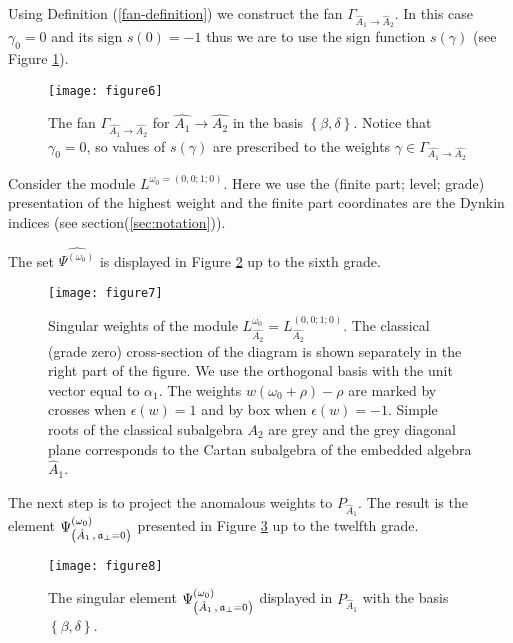 Using Definition (\ref{fan-definition})  we construct the fan $\Gamma_{\hat A_1\to\hat A_2}$.
In this case $\gamma_0 =0$ and its sign $s\left( 0 \right)=-1$ thus we are to use the
sign function $s(\gamma)$ (see Figure \ref{fig:AffineA2A1Fan}).


\begin{figure}[h!bt]
  \centering
  \texttt{[image: figure6]}

  \caption{The fan $\Gamma_{\hat{A_1}\rightarrow \hat{A_2}}$ for $\hat{A_1}\rightarrow \hat{A_2}$
  in the basis $\left\{\beta,\delta \right\}$. Notice that $\gamma_0 =0$, so values of $s(\gamma)$
  are prescribed to the weights $\gamma\in \Gamma_{\hat{A_1}\rightarrow \hat{A_2}}$}
  \label{fig:AffineA2A1Fan}
\end{figure}

Consider the module $L^{\omega_0=(0,0;1;0)}$. Here we use the (finite part; level; grade)
presentation of the highest weight and the finite part
coordinates are the Dynkin indices (see section(\ref{sec:notation})).

The set $\widehat{\Psi^{(\omega_0)}}$  is displayed in Figure
\ref{fig:affine_A2_anom_point} up to the sixth grade.

\begin{figure}[h!tb]
  \hspace*{-1.5cm}
  \texttt{[image: figure7]}
  \caption{Singular weights of the module $L_{\hat{A_2}}^{\omega_0}=L^{(0,0;1;0)}_{\hat{A_2}}$.
   The classical (grade zero) cross-section of the diagram is shown separately
   in the right part of the figure.
  We use the orthogonal basis with the unit vector equal to $\alpha_1$.
  The weights $w (\omega_0+\rho)-\rho$ are marked by crosses when $\epsilon(w)=1$ and
by box when $\epsilon(w)=-1$. Simple roots of the classical subalgebra $A_2$ are
grey and the grey diagonal plane corresponds to the Cartan subalgebra of
the embedded algebra $\hat{A}_1$.}
  \label{fig:affine_A2_anom_point}
\end{figure}

The next step is  to project the anomalous weights to $P_{\hat A_1}$.
The result is the element $\Psi ^{\left( \omega_0 \right) }_{\left(  \hat A_1\, , \, \mathfrak{a}_{\bot}=0 \right)}$
presented in Figure \ref{fig:AffineA2_A1_anom_proj} up to the twelfth grade.
\begin{figure}[h!tb]
  \centering
  \texttt{[image: figure8]}
  \caption{The singular element $\Psi ^{\left( \omega_0 \right) }_{\left(  \hat A_1\, , \, \mathfrak{a}_{\bot}=0 \right)}$
  displayed in $P_{\hat A_1}$
  with the basis $\left\{\beta,\delta \right\}$.}
  \label{fig:AffineA2_A1_anom_proj}
\end{figure}


